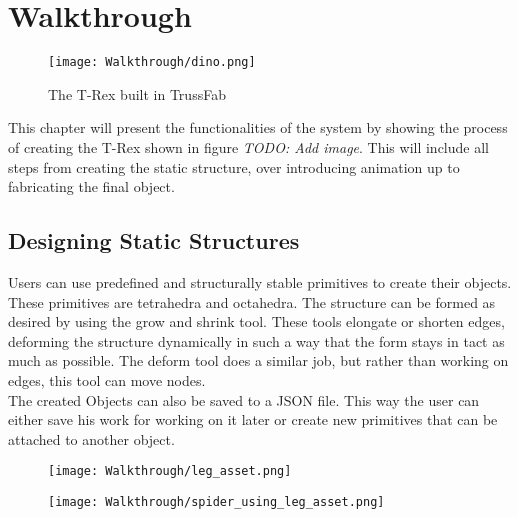 \chapter{Walkthrough}\label{ch:walkthrough}
\begin{figure}[h!]
    \texttt{[image: Walkthrough/dino.png]}
    \centering
    \caption{The T-Rex built in TrussFab}
    \label{fig:sketchup_objects}
\end{figure}
This chapter will present the functionalities of the system by showing the process of creating the T-Rex shown in figure \textit{TODO: Add image}. This will include all steps from creating the static structure, over introducing animation up to fabricating the final object.

\section{Designing Static Structures}
Users can use predefined and structurally stable primitives to create their objects. These primitives are tetrahedra and octahedra. The structure can be formed as desired by using the grow and shrink tool. These tools elongate or shorten edges, deforming the structure dynamically in such a way that the form stays in tact as much as possible. The deform tool does a similar job, but rather than working on edges, this tool can move nodes.\\
The created Objects can also be saved to a JSON file. This way the user can either save his work for working on it later or create new primitives that can be attached to another object.
\begin{figure}
  \centering
  \begin{minipage}{.5\textwidth}
    \centering
    \texttt{[image: Walkthrough/leg\_asset.png]}
    \label{fig:leg_asset}
  \end{minipage}%
  \begin{minipage}{.5\textwidth}
    \centering
    \texttt{[image: Walkthrough/spider\_using\_leg\_asset.png]}
    \label{fig:spider_in_progress}
  \end{minipage}
\end{figure}

